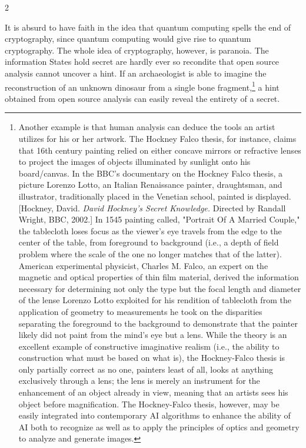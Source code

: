 \documentclass[10pt,a4paper,twoside]{article} %
\begin{document}
\begin{multicols}{2}
{\newline \indent It is absurd to have faith in the idea that quantum computing spells the end of cryptography, since quantum computing would give rise to quantum cryptography. The whole idea of cryptography, however, is paranoia. The information States hold secret are hardly ever so recondite that open source analysis cannot uncover a hint. If an archaeologist is able to imagine the reconstruction of an unknown dinosaur from a single bone fragment,\footnote{Another example is that human analysis can deduce the tools an artist utilizes for his or her artwork. The Hockney Falco thesis, for instance, claims that 16th century painting relied on either concave mirrors or refractive lenses to project the images of objects illuminated by sunlight onto his board/canvas. In the BBC's documentary on the Hockney Falco thesis, a picture Lorenzo Lotto, an Italian Renaissance painter, draughtsman, and illustrator, traditionally placed in the Venetian school, painted is displayed. [Hockney, David. \emph{David Hockney's Secret Knowledge.} Directed by Randall Wright, BBC, 2002.] In 1545 painting called, "Portrait Of A Married Couple," the tablecloth loses focus as the viewer's eye travels from the edge to the center of the table, from foreground to background (i.e., a depth of field problem where the scale of the one no longer matches that of the latter). American experimental physicist, Charles M. Falco, an expert on the magnetic and optical properties of thin film material, derived the information necessary for determining not only the type but the focal length and diameter of the lense Lorenzo Lotto exploited for his rendition of tablecloth from the application of geometry to measurements he took on the disparities separating the foreground to the background to demonstrate that the painter likely did not paint from the mind's eye but a lens. While the theory is an excellent example of constructive imaginative realism (i.e., the ability to construction what must be based on what is), the Hockney-Falco thesis is only partially correct as no one, painters least of all, looks at anything exclusively through a lens; the lens is merely an instrument for the enhancement of an object already in view, meaning that an artists sees his object before magnification. The Hockney-Falco thesis, however, may be easily integrated into contemporary AI algorithms to enhance the ability of AI both to recognize as well as to apply the principles of optics and geometry to analyze and generate images.} a hint obtained from open source analysis can easily reveal the entirety of a secret. 

}
\end{multicols}
\end{document}
